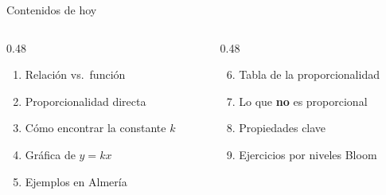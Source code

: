 \documentclass[aspectratio=169, 10pt, spanish]{beamer}
\begin{document}
\begin{frame}[plain]
  \titlepage
\end{frame}

\begin{frame}{Contenidos de hoy}
  \begin{columns}[t]
    \begin{column}{0.48\textwidth}
      \begin{enumerate}
        \item Relación vs.\ función
        \item Proporcionalidad directa
        \item Cómo encontrar la constante $k$
        \item Gráfica de $y = kx$
        \item Ejemplos en Almería
      \end{enumerate}
    \end{column}
    \begin{column}{0.48\textwidth}
      \begin{enumerate}\setcounter{enumi}{5}
        \item Tabla de la proporcionalidad
        \item Lo que \textbf{no} es proporcional
        \item Propiedades clave
        \item Ejercicios por niveles Bloom
      \end{enumerate}
    \end{column}
  \end{columns}
  \vspace{0.4cm}
  \begin{center}
  \end{center}
\end{frame}

\end{document}
